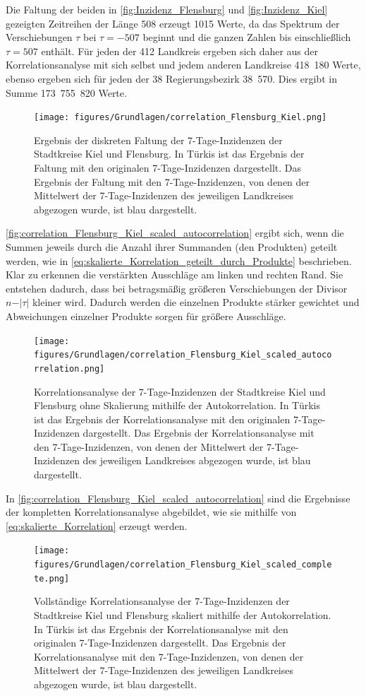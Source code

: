 Die Faltung der beiden in \autoref{fig:Inzidenz_Flensburg} und \autoref{fig:Inzidenz_Kiel} gezeigten Zeitreihen der Länge 508 erzeugt 1015 Werte, da das Spektrum der Verschiebungen $\tau$ bei $\tau=-507$ beginnt und die ganzen Zahlen bis einschließlich $\tau=507$ enthält.
Für jeden der 412 Landkreis ergeben sich daher aus der Korrelationsanalyse mit sich selbst und jedem anderen Landkreise 418~180 Werte, ebenso ergeben sich für jeden der 38 Regierungsbezirk 38~570. Dies ergibt in Summe 
173~755~820 Werte.
\begin{figure}[H]
    \centering
    \texttt{[image: figures/Grundlagen/correlation\_Flensburg\_Kiel.png]}
    \caption{Ergebnis der diskreten Faltung der 7-Tage-Inzidenzen der Stadtkreise Kiel und Flensburg.
    In Türkis ist das Ergebnis der Faltung mit den originalen 7-Tage-Inzidenzen dargestellt. Das Ergebnis der Faltung mit den 7-Tage-Inzidenzen, von denen der Mittelwert der 7-Tage-Inzidenzen des jeweiligen Landkreises abgezogen wurde, ist blau dargestellt.}
    \label{fig:correlation_Flensburg_Kiel}
\end{figure}
\autoref{fig:correlation_Flensburg_Kiel_scaled_autocorrelation} ergibt sich, wenn die Summen jeweils durch die Anzahl ihrer Summanden (den Produkten) geteilt werden, wie in \autoref{eq:skalierte_Korrelation_geteilt_durch_Produkte} beschrieben. Klar zu erkennen die verstärkten Ausschläge am linken und rechten Rand. Sie entstehen dadurch, dass bei betragsmäßig größeren Verschiebungen der Divisor $n-\vert\tau\vert$ kleiner wird. Dadurch werden die einzelnen Produkte stärker gewichtet und Abweichungen einzelner Produkte sorgen für größere Ausschläge.
\begin{figure}[H]
    \centering
    \texttt{[image: figures/Grundlagen/correlation\_Flensburg\_Kiel\_scaled\_autocorrelation.png]}
    \caption{Korrelationsanalyse der 7-Tage-Inzidenzen der Stadtkreise Kiel und Flensburg ohne Skalierung mithilfe der Autokorrelation.
    In Türkis ist das Ergebnis der Korrelationsanalyse mit den originalen 7-Tage-Inzidenzen dargestellt. Das Ergebnis der Korrelationsanalyse mit den 7-Tage-Inzidenzen, von denen der Mittelwert der 7-Tage-Inzidenzen des jeweiligen Landkreises abgezogen wurde, ist blau dargestellt.}
    \label{fig:correlation_Flensburg_Kiel_scaled_autocorrelation}
\end{figure}
In \autoref{fig:correlation_Flensburg_Kiel_scaled_autocorrelation} sind die Ergebnisse der kompletten Korrelationsanalyse abgebildet, wie sie mithilfe von \autoref{eq:skalierte_Korrelation} erzeugt werden.
\begin{figure}[H]
    \centering
    \texttt{[image: figures/Grundlagen/correlation\_Flensburg\_Kiel\_scaled\_complete.png]}
    \caption{Vollständige Korrelationsanalyse der 7-Tage-Inzidenzen der Stadtkreise Kiel und Flensburg skaliert mithilfe der Autokorrelation.
    In Türkis ist das Ergebnis der Korrelationsanalyse mit den originalen 7-Tage-Inzidenzen dargestellt. Das Ergebnis der Korrelationsanalyse mit den 7-Tage-Inzidenzen, von denen der Mittelwert der 7-Tage-Inzidenzen des jeweiligen Landkreises abgezogen wurde, ist blau dargestellt.}
    \label{fig:correlation_Flensburg_Kiel_scaled_complete}
\end{figure}

